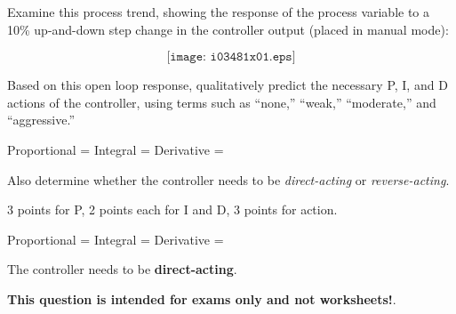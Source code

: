 

Examine this process trend, showing the response of the process variable to a 10\% up-and-down step change in the controller output (placed in manual mode):

$$\texttt{[image: i03481x01.eps]}$$

Based on this open loop response, qualitatively predict the necessary P, I, and D actions of the controller, using terms such as ``none,'' ``weak,'' ``moderate,'' and ``aggressive.''

\vskip 10pt

Proportional = \underbar{\hskip 70pt} \hskip 20pt Integral = \underbar{\hskip 70pt} \hskip 20pt Derivative = \underbar{\hskip 70pt}

\vskip 10pt

Also determine whether the controller needs to be {\it direct-acting} or {\it reverse-acting}.







3 points for P, 2 points each for I and D, 3 points for action.

\vskip 10pt

\noindent
Proportional =  \hskip 10pt Integral =  \hskip 10pt Derivative = 

\vskip 10pt

The controller needs to be {\bf direct-acting}.







{\bf This question is intended for exams only and not worksheets!}.



